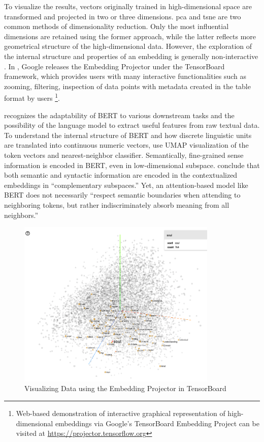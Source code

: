 To visualize the results, vectors originally trained in high-dimensional space are transformed and projected in two or three dimensions. \gls{pca} and \gls{tsne} \parencite{vandermaaten2008tsne} are two common methods of dimensionality reduction. Only the most influential dimensions are retained using the former approach, while the latter reflects more geometrical structure of the high-dimensional data. However, the exploration of the internal structure and properties of an embedding is generally non-interactive \parencite{smilkov2016projector}. In \citeyear{smilkov2016projector}, Google releases the Embedding Projector under the TensorBoard framework, which provides users with many interactive functionalities such as zooming, filtering, inspection of data points with metadata created in the table format by users \parencite{smilkov2016projector}\footnote{Web-based demonstration of interactive graphical representation of high-dimensional embeddings via Google's TensorBoard Embedding Project can be visited at \url{https://projector.tensorflow.org}}.

\textcite{coenen2019visualizing} recognizes the adaptability of BERT to various downstream tasks and the possibility of the language model to extract useful features from raw textual data. To understand the internal structure of BERT and how discrete linguistic units are translated into continuous numeric vectors, \textcite{coenen2019visualizing} use UMAP visualization of the token vectors and nearest-neighbor classifier. Semantically, fine-grained sense information is encoded in BERT, even in low-dimensional subspace. \textcite{coenen2019visualizing} conclude that both semantic and syntactic information are encoded in the contextualized embeddings in ``complementary subspaces.'' Yet, an attention-based model like BERT does not necessarily ``respect semantic boundaries when attending to neighboring tokens, but rather indiscriminately absorb meaning from all neighbors.'' \parencite{coenen2019visualizing}

\begin{figure}[H]
  \centering
  \includegraphics[width=0.85\textwidth,keepaspectratio]{figures_ref/embedding_projector_demo}
  \caption{Visualizing Data using the Embedding Projector in TensorBoard}
\end{figure}

